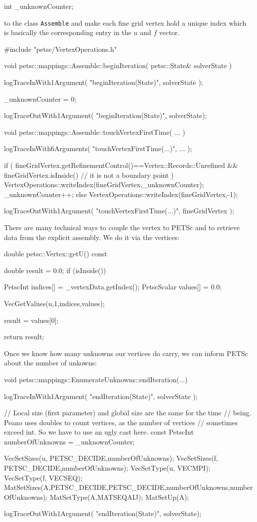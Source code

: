 \begin{code}
int  _unknownCounter;
\end{code}

\noindent
to the class \texttt{Assemble} and make each fine grid vertex hold a unique
index which is basically the corresponding entry in the $u$ and $f$ vector.

\begin{code}
#include "petsc/VertexOperations.h"

void petsc::mappings::Assemble::beginIteration(
  petsc::State&  solverState
) {
  logTraceInWith1Argument( "beginIteration(State)", solverState );

  _unknownCounter = 0;

  logTraceOutWith1Argument( "beginIteration(State)", solverState);
}

void petsc::mappings::Assemble::touchVertexFirstTime(
  ...
) {
  logTraceInWith6Arguments( "touchVertexFirstTime(...)", ... );

  if (
    fineGridVertex.getRefinementControl()==Vertex::Records::Unrefined
    &&
    fineGridVertex.isInside() // it is not a boundary point
  ) {
    VertexOperations::writeIndex(fineGridVertex,_unknownCounter);
    _unknownCounter++;
  }
  else {
    VertexOperations::writeIndex(fineGridVertex,-1);
  }

  logTraceOutWith1Argument( "touchVertexFirstTime(...)", fineGridVertex );
}
\end{code}

\noindent
There are many technical ways to couple the vertex to PETSc and to retrieve
data from the explicit assembly.
We do it via the vertices:

\begin{code}
double petsc::Vertex::getU() const {
  double result = 0.0;
  if (isInside()) {
    PetscInt     indices[] = {_vertexData.getIndex()};
    PetscScalar  values[]  = {0.0};

    VecGetValues(u,1,indices,values);

    result = values[0];
  }
  return result;
}
\end{code}


\noindent
Once we know how many unknowns our vertices do carry, we can inform PETSc about
the number of unkowns:

\begin{code}
void petsc::mappings::EnumerateUnknowns::endIteration(...) {
  logTraceInWith1Argument( "endIteration(State)", solverState );

  // Local size (first parameter) and global size are the same for the time
  // being. Peano uses doubles to count vertices, as the number of vertices
  // sometimes exceed int. So we have to use an ugly cast here.
  const PetscInt numberOfUnknowns = _unknownCounter;

  VecSetSizes(u, PETSC_DECIDE,numberOfUnknowns);
  VecSetSizes(f, PETSC_DECIDE,numberOfUnknowns);
  VecSetType(u, VECMPI);
  VecSetType(f, VECSEQ);
  MatSetSizes(A,PETSC_DECIDE,PETSC_DECIDE,numberOfUnknowns,numberOfUnknowns);
  MatSetType(A,MATSEQAIJ);
  MatSetUp(A);

  logTraceOutWith1Argument( "endIteration(State)", solverState);
}
\end{code}


